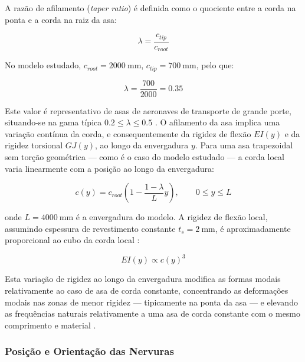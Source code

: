 \documentclass[a4paper,fleqn]{cas-sc}
\begin{document}
A razão de afilamento (\textit{taper ratio}) é definida como o quociente entre a corda na ponta e a corda na raiz da asa:

\begin{equation}
    \lambda = \frac{c_{tip}}{c_{root}}
    \label{eq:taper_ratio}
\end{equation}

No modelo estudado, $c_{root} = \SI{2000}{\milli\meter}$, 
$c_{tip} = \SI{700}{\milli\meter}$, pelo que:

\begin{equation}
    \lambda = \frac{700}{2000} = 0.35
    \label{eq:taper_ratio_an124}
\end{equation}

Este valor é representativo de asas de aeronaves de transporte de grande porte, situando-se na gama típica $0.2 \leq \lambda \leq 0.5$ \cite{Raymer2018}. O afilamento da asa implica uma variação contínua da corda, e consequentemente da rigidez de flexão $EI(y)$ e da rigidez torsional $GJ(y)$, ao longo da envergadura $y$. Para uma asa trapezoidal sem torção geométrica --- como é o caso do modelo estudado --- a corda local varia linearmente com a posição ao longo da envergadura:

\begin{equation}
    c(y) = c_{root}\left(1 - \frac{1-\lambda}{L}y\right), 
    \qquad 0 \leq y \leq L
    \label{eq:corda_local}
\end{equation}

\noindent onde $L = \SI{4000}{\milli\meter}$ é a envergadura do modelo. A rigidez de flexão local, assumindo espessura de revestimento constante $t_s = \SI{2}{\milli\meter}$, é aproximadamente proporcional ao cubo da corda local \cite{Megson2012}:

\begin{equation}
    EI(y) \propto c(y)^3
    \label{eq:EI_local}
\end{equation}

Esta variação de rigidez ao longo da envergadura modifica as formas modais relativamente ao caso de asa de corda constante, concentrando as deformações modais nas zonas de menor rigidez --- tipicamente na ponta da asa --- e elevando as frequências naturais relativamente a uma asa de corda constante com o mesmo comprimento e material \cite{Rao2011}.

\subsubsection{Posição e Orientação das Nervuras}
\end{document}
